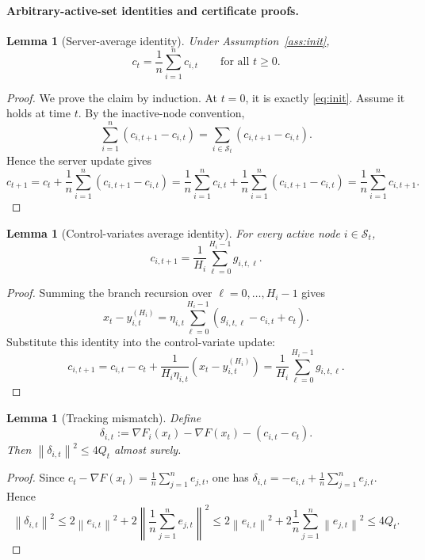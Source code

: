 \documentclass{article}
\newtheorem{lemma}[theorem]{Lemma}
\theoremstyle{definition}
\newcommand{\norm}[1]{\left\lVert #1\right\rVert}
\begin{document}
\paragraph{Arbitrary-active-set identities and certificate proofs.}

\begin{lemma}[Server-average identity]
\label{lem:c-average}
Under Assumption~\ref{ass:init},
\[
c_t=\frac1n\sum_{i=1}^n c_{i,t}
\qquad\text{for all }t\ge 0.
\]
\end{lemma}

\begin{proof}
We prove the claim by induction. At $t=0$, it is exactly
\eqref{eq:init}. Assume it holds at time $t$. By the inactive-node convention,
\[
\sum_{i=1}^n(c_{i,t+1}-c_{i,t})
=
\sum_{i\in\mathcal S_t}(c_{i,t+1}-c_{i,t}).
\]
Hence the server update gives
\[
c_{t+1}
=
c_t+\frac1n\sum_{i=1}^n(c_{i,t+1}-c_{i,t})
=
\frac1n\sum_{i=1}^n c_{i,t}
+
\frac1n\sum_{i=1}^n(c_{i,t+1}-c_{i,t})
=
\frac1n\sum_{i=1}^n c_{i,t+1}.
\]
\end{proof}

\begin{lemma}[Control-variates average identity]
\label{lem:avg}
For every active node $i\in\mathcal S_t$,
\[
c_{i,t+1}
=
\frac1{H_i}\sum_{\ell=0}^{H_i-1}g_{i,t,\ell}.
\]
\end{lemma}

\begin{proof}
Summing the branch recursion over $\ell=0,\dots,H_i-1$ gives
\[
x_t-y_{i,t}^{(H_i)}
=
\eta_{i,t}\sum_{\ell=0}^{H_i-1}(g_{i,t,\ell}-c_{i,t}+c_t).
\]
Substitute this identity into the control-variate update:
\[
c_{i,t+1}
=
c_{i,t}-c_t+\frac{1}{H_i\eta_{i,t}}(x_t-y_{i,t}^{(H_i)})
=
\frac1{H_i}\sum_{\ell=0}^{H_i-1}g_{i,t,\ell}.
\]
\end{proof}

\begin{lemma}[Tracking mismatch]
\label{lem:delta}
Define
\[
\delta_{i,t}
:=
\nabla F_i(x_t)-\nabla F(x_t)-(c_{i,t}-c_t).
\]
Then
$\norm{\delta_{i,t}}^2\le 4Q_t$ almost surely.
\end{lemma}

\begin{proof}
Since
$c_t-\nabla F(x_t)=\frac1n\sum_{j=1}^n e_{j,t}$,
one has 
$\delta_{i,t}=-e_{i,t}+\frac1n\sum_{j=1}^n e_{j,t}$.
Hence
\[
\norm{\delta_{i,t}}^2
\le
2\norm{e_{i,t}}^2+2\left\|\frac1n\sum_{j=1}^n e_{j,t}\right\|^2
\le
2\norm{e_{i,t}}^2+2\frac1n\sum_{j=1}^n\norm{e_{j,t}}^2
\le 4Q_t.
\]
\end{proof}
\end{document}
